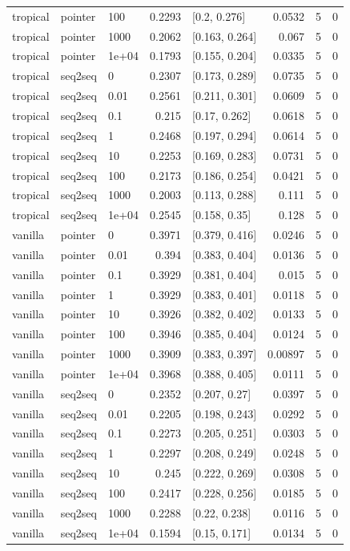 \documentclass[10pt]{article}
\begin{document}
{\begin{longtable}{lllrlrrr}
tropical & pointer & 100 & 0.2293 & [0.2, 0.276] & 0.0532 & 5 & 0\\
tropical & pointer & 1000 & 0.2062 & [0.163, 0.264] & 0.067 & 5 & 0\\
tropical & pointer & 1e+04 & 0.1793 & [0.155, 0.204] & 0.0335 & 5 & 0\\
tropical & seq2seq & 0 & 0.2307 & [0.173, 0.289] & 0.0735 & 5 & 0\\
tropical & seq2seq & 0.01 & 0.2561 & [0.211, 0.301] & 0.0609 & 5 & 0\\
tropical & seq2seq & 0.1 & 0.215 & [0.17, 0.262] & 0.0618 & 5 & 0\\
tropical & seq2seq & 1 & 0.2468 & [0.197, 0.294] & 0.0614 & 5 & 0\\
tropical & seq2seq & 10 & 0.2253 & [0.169, 0.283] & 0.0731 & 5 & 0\\
tropical & seq2seq & 100 & 0.2173 & [0.186, 0.254] & 0.0421 & 5 & 0\\
tropical & seq2seq & 1000 & 0.2003 & [0.113, 0.288] & 0.111 & 5 & 0\\
tropical & seq2seq & 1e+04 & 0.2545 & [0.158, 0.35] & 0.128 & 5 & 0\\
vanilla & pointer & 0 & 0.3971 & [0.379, 0.416] & 0.0246 & 5 & 0\\
vanilla & pointer & 0.01 & 0.394 & [0.383, 0.404] & 0.0136 & 5 & 0\\
vanilla & pointer & 0.1 & 0.3929 & [0.381, 0.404] & 0.015 & 5 & 0\\
vanilla & pointer & 1 & 0.3929 & [0.383, 0.401] & 0.0118 & 5 & 0\\
vanilla & pointer & 10 & 0.3926 & [0.382, 0.402] & 0.0133 & 5 & 0\\
vanilla & pointer & 100 & 0.3946 & [0.385, 0.404] & 0.0124 & 5 & 0\\
vanilla & pointer & 1000 & 0.3909 & [0.383, 0.397] & 0.00897 & 5 & 0\\
vanilla & pointer & 1e+04 & 0.3968 & [0.388, 0.405] & 0.0111 & 5 & 0\\
vanilla & seq2seq & 0 & 0.2352 & [0.207, 0.27] & 0.0397 & 5 & 0\\
vanilla & seq2seq & 0.01 & 0.2205 & [0.198, 0.243] & 0.0292 & 5 & 0\\
vanilla & seq2seq & 0.1 & 0.2273 & [0.205, 0.251] & 0.0303 & 5 & 0\\
vanilla & seq2seq & 1 & 0.2297 & [0.208, 0.249] & 0.0248 & 5 & 0\\
vanilla & seq2seq & 10 & 0.245 & [0.222, 0.269] & 0.0308 & 5 & 0\\
vanilla & seq2seq & 100 & 0.2417 & [0.228, 0.256] & 0.0185 & 5 & 0\\
vanilla & seq2seq & 1000 & 0.2288 & [0.22, 0.238] & 0.0116 & 5 & 0\\
vanilla & seq2seq & 1e+04 & 0.1594 & [0.15, 0.171] & 0.0134 & 5 & 0\\
\bottomrule
\end{longtable}
}
\end{document}
